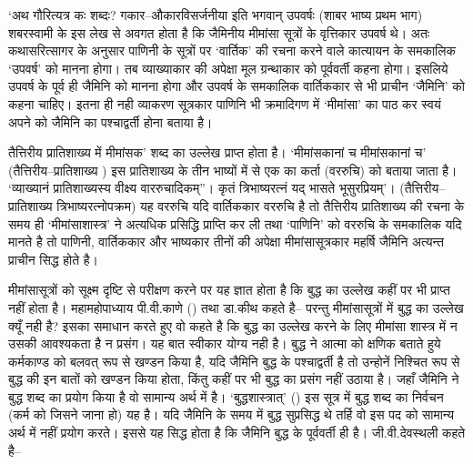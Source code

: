 ‘अथ गौरित्यत्र कः शब्दः? गकार–औकारविसर्जनीया इति भगवान् उपवर्षः (शाबर भाष्य प्रथम भाग) शबरस्वामी के इस लेख से अवगत होता है कि जैमिनीय मीमांसा सूत्रों के वृत्तिकार उपवर्ष थे। अतः कथासरित्सागर के अनुसार पाणिनी के सूत्रों पर ‘वार्तिक' की रचना करने वाले कात्यायन के समकालिक ‘उपवर्ष' को मानना होगा। तब व्याख्याकार की अपेक्षा मूल ग्रन्थाकार को पूर्ववर्ती कहना होगा। इसलिये उपवर्ष के पूर्व ही जैमिनि को मानना होगा और उपवर्ष के समकालिक वार्तिककार से भी प्राचीन ‘जैमिनि' को कहना चाहिए। इतना ही नही व्याकरण सूत्रकार पाणिनि भी क्रमादिगण में ‘मीमांसा' का पाठ कर स्वयं अपने को जैमिनि का पश्चाद्वर्ती होना बताया है।

तैत्तिरीय प्रातिशाख्य में मीमांसक' शब्द का उल्लेख प्राप्त होता है। ‘मीमांसकानां च मीमांसकानां च' (तैत्तिरीय–प्रातिशाख्य ) इस प्रातिशाख्य के तीन भाष्यों में से एक का कर्ता (वररुचि) को बताया जाता है। ‘व्याख्यानं प्रातिशाख्यस्य वीक्ष्य वाररुचादिकम्”। कृतं त्रिभाष्यरत्नं यद् भासते भूसुरप्रियम्'। (तैत्तिरीय–प्रातिशाख्य त्रिभाष्यरत्नोपक्रम) यह वररुचि यदि वार्तिककार वररुचि है तो तैत्तिरीय प्रातिशाख्य की रचना के समय ही ‘मीमांसाशास्त्र' ने अत्यधिक प्रसिद्धि प्राप्ति कर ली तथा ‘पाणिनि' को वररुचि के समकालिक यदि मानते है तो पाणिनी, वार्तिककार और भाष्यकार तीनों की अपेक्षा मीमांसासूत्रकार महर्षि जैमिनि अत्यन्त प्राचीन सिद्ध होते है।

मीमांसासूत्रों को सूक्ष्म दृष्टि से परीक्षण करने पर यह ज्ञात होता है कि बुद्ध का उल्लेख कहीं पर भी प्राप्त नहीं होता है। महामहोपाध्याय पी.वी.काणे () तथा डा.कीथ कहते है–  परन्तु मीमांसासूत्रों में बुद्ध का उल्लेख क्यूँ नही है? इसका समाधान करते हुए वो कहते है कि बुद्ध का उल्लेख करने के लिए मीमांसा शास्त्र में न उसकी आवश्यकता है न प्रसंग। यह बात स्वीकार योग्य नही है। बुद्ध ने आत्मा को क्षणिक बताते हुये कर्मकाण्ड को बलवत् रूप से खण्डन किया है, यदि जैमिनि बुद्ध के पश्चाद्वर्ती है तो उन्होनें निश्चित रूप से बुद्ध की इन बातों को खण्डन किया होता, किंतु कहीं पर भी बुद्ध का प्रसंग नहीं उठाया है। जहाँ जैमिनि ने बुद्ध शब्द का प्रयोग किया है वो सामान्य अर्थ में है। ‘बुद्धशास्त्रात्' () इस सूत्र में बुद्ध शब्द का निर्वचन (कर्म को जिसने जाना हो) यह है। यदि जैमिनि के समय में बुद्ध सुप्रसिद्ध थे तर्हि वो इस पद को सामान्य अर्थ में नहीं प्रयोग करते। इससे यह सिद्ध होता है कि जैमिनि बुद्ध के पूर्ववर्ती ही है। जी.वी.देवस्थली कहते है– 


